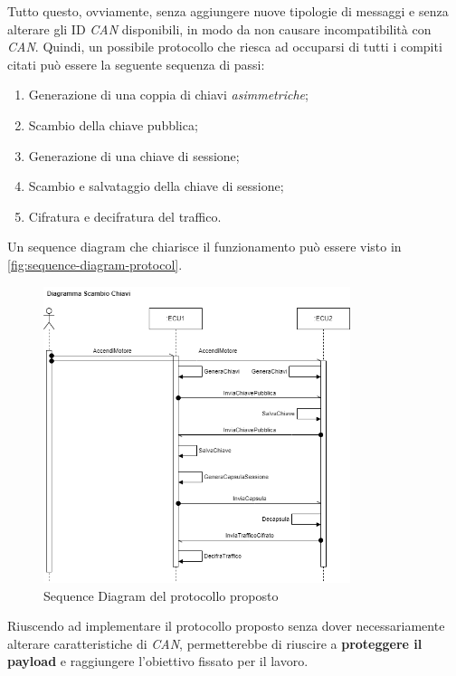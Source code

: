 Tutto questo, ovviamente, senza aggiungere nuove tipologie di messaggi e senza alterare gli ID \emph{CAN} disponibili, in modo da non causare incompatibilità con \emph{CAN}. Quindi, un possibile protocollo che riesca ad occuparsi di tutti i compiti citati può essere la seguente sequenza di passi:
\begin{enumerate}
    \item Generazione di una coppia di chiavi \emph{asimmetriche};
    \item Scambio della chiave pubblica;
    \item Generazione di una chiave di sessione;
    \item Scambio e salvataggio della chiave di sessione;
    \item Cifratura e decifratura del traffico.
\end{enumerate}

Un sequence diagram che chiarisce il funzionamento può essere visto in \autoref{fig:sequence-diagram-protocol}.
\begin{figure}[h]
    \centering
    \includegraphics[width=0.8\textwidth]{capitoli/figure-soluzione-proposta/sequence-key-exchange.png}
    \caption{Sequence Diagram del protocollo proposto}
    \label{fig:sequence-diagram-protocol}
\end{figure}

Riuscendo ad implementare il protocollo proposto senza dover necessariamente alterare caratteristiche di \emph{CAN}, permetterebbe di riuscire a \textbf{proteggere il payload} e raggiungere l'obiettivo fissato per il lavoro.